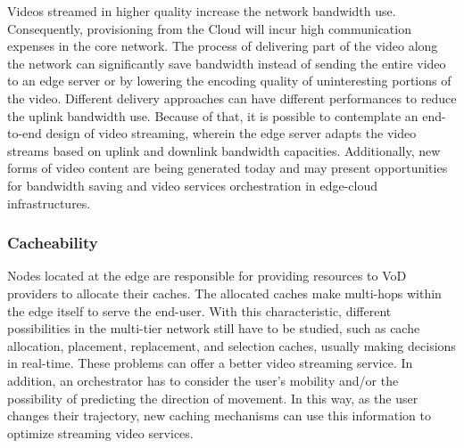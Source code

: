 Videos streamed in higher quality increase the network bandwidth use. Consequently, provisioning from the Cloud will incur high communication expenses in the core network. 
The process of delivering part of the video along the network can significantly save bandwidth instead of sending the entire video to an edge server or by lowering the encoding quality of uninteresting portions of the video. Different delivery approaches can have different performances to reduce the uplink bandwidth use. 
Because of that, it is possible to contemplate an end-to-end design of video streaming, wherein the edge server adapts the video streams based on uplink and downlink bandwidth capacities. Additionally, new forms of video content are being generated today and may present opportunities for bandwidth saving and video services orchestration in edge-cloud infrastructures.


\subsubsection{Cacheability}


Nodes located at the edge are responsible for providing resources to VoD providers to allocate their caches. 
The allocated caches make multi-hops within the edge itself to serve the end-user. 
With this characteristic, different possibilities in the multi-tier network still have to be studied, such as cache allocation, placement, replacement, and selection caches, usually making decisions in real-time. These problems can offer a better video streaming service. 
In addition, an orchestrator has to consider the user's mobility and/or the possibility of predicting the direction of movement. In this way, as the user changes their trajectory, new caching mechanisms can use this information to optimize streaming video services.
